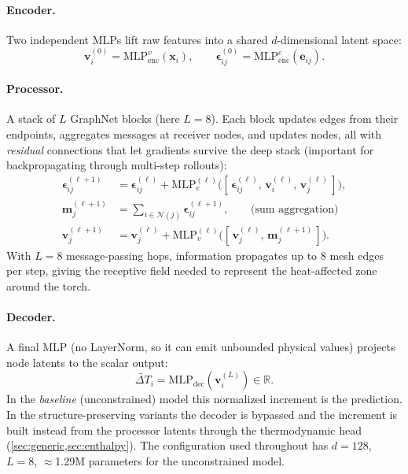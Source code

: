 \documentclass[11pt]{article}
\newcommand{\Rset}{\mathbb{R}}
\theoremstyle{definition}
\begin{document}
\paragraph{Encoder.} Two independent MLPs lift raw features into a shared
$d$-dimensional latent space:
\begin{equation}
  \bm v_i^{(0)} = \mathrm{MLP}_{\mathrm{enc}}^{v}(\bm x_i),
  \qquad
  \bm \epsilon_{ij}^{(0)} = \mathrm{MLP}_{\mathrm{enc}}^{e}(\bm e_{ij}).
\end{equation}

\paragraph{Processor.} A stack of $L$ GraphNet blocks (here $L=8$). Each block updates
edges from their endpoints, aggregates messages at receiver nodes, and updates nodes,
all with \emph{residual} connections that let gradients survive the deep stack
(important for backpropagating through multi-step rollouts):
\begin{align}
  \bm\epsilon_{ij}^{(\ell+1)}
    &= \bm\epsilon_{ij}^{(\ell)}
      + \mathrm{MLP}_e^{(\ell)}\!\big([\,\bm\epsilon_{ij}^{(\ell)},\,
        \bm v_i^{(\ell)},\,\bm v_j^{(\ell)}\,]\big),
        \label{eq:edgeupdate}\\[2pt]
  \bm m_j^{(\ell+1)} &= \!\!\sum_{i\in\mathcal N(j)}\!\! \bm\epsilon_{ij}^{(\ell+1)},
        \qquad\text{(sum aggregation)}\\[2pt]
  \bm v_j^{(\ell+1)}
    &= \bm v_j^{(\ell)}
      + \mathrm{MLP}_v^{(\ell)}\!\big([\,\bm v_j^{(\ell)},\,\bm m_j^{(\ell+1)}\,]\big).
        \label{eq:nodeupdate}
\end{align}
With $L=8$ message-passing hops, information propagates up to 8 mesh edges per step,
giving the receptive field needed to represent the heat-affected zone around the torch.

\paragraph{Decoder.} A final MLP (no LayerNorm, so it can emit unbounded physical
values) projects node latents to the scalar output:
\begin{equation}
  \widetilde{\Delta T}_i = \mathrm{MLP}_{\mathrm{dec}}(\bm v_i^{(L)}) \in \Rset.
\end{equation}
In the \emph{baseline} (unconstrained) model this normalized increment is the
prediction. In the structure-preserving variants the decoder is bypassed and the
increment is built instead from the processor latents through the thermodynamic head
(\cref{sec:generic,sec:enthalpy}). The configuration used throughout has
$d=128$, $L=8$, $\approx$\num{1.29}M parameters for the unconstrained model.
\end{document}
